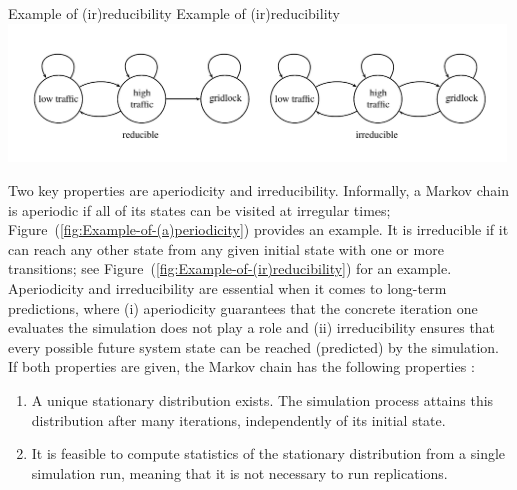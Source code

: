 \createfigure%
{Example of (ir)reducibility}%
{Example of (ir)reducibility}%
{\label{fig:Example-of-(ir)reducibility}}%
{\includegraphics[width=0.99\textwidth, angle=0]{understanding/figures/mc/fig2.pdf}}%
{}

Two key properties are\corr{:}{} aperiodicity and irreducibility. Informally,
a Markov chain is aperiodic if all of its states can be visited at
irregular times; Figure~(\ref{fig:Example-of-(a)periodicity}) provides
an example. It is irreducible if it can reach any other state from any given initial
state with one or more transitions; see Figure~(\ref{fig:Example-of-(ir)reducibility})
for an example. Aperiodicity and irreducibility are essential when
it comes to long-term predictions, where (i) aperiodicity guarantees
that the concrete iteration  one evaluates the simulation
does not play a role and (ii) irreducibility ensures that every possible
future system state can be reached (predicted) by the simulation.
If both properties are given, the Markov chain has the following properties
\citep{ross-2006}:
\begin{enumerate}
\item A unique stationary distribution exists. The simulation process attains
this distribution after many iterations, independently of its initial state.
\item It is feasible to compute statistics of the stationary distribution
from a single simulation run, meaning that it is not necessary to
run replications.
\label{it:self-averaging}
\end{enumerate}


